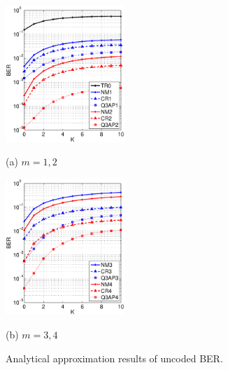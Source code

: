 \documentclass[journal,draftcls,onecolumn,12pt,twoside]{IEEEtran}
\begin{document}
\begin{figure}[!t]
  \begin{minipage}[b]{.48\linewidth}
    \centering
    \centerline{\includegraphics[width=4.5cm]{./figs/BER_K_upperbound_64QAM_12.eps}}
    \centerline{(a) $m=1,2$}\medskip
  \end{minipage}
  \hfill
  \begin{minipage}[b]{0.48\linewidth}
    \centering
    \centerline{\includegraphics[width=4.5cm]{./figs/BER_K_upperbound_64QAM_34.eps}}
    \centerline{(b) $m=3,4$}\medskip
  \end{minipage}
  \caption{Analytical approximation results of uncoded BER.}
  \label{fig:uncoded_K_approx}
\end{figure}
\end{document}
